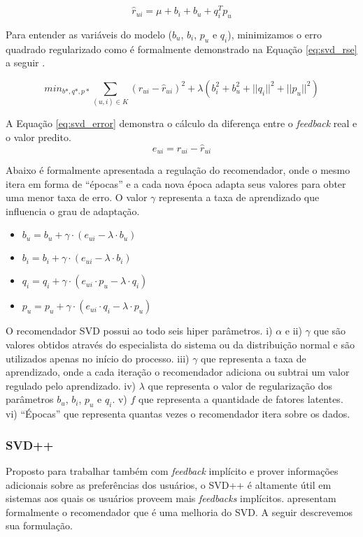 \begin{equation}
    \label{eq:svd_rating_bias}
    \hat{r}_{ui} = \mu + b_i + b_u + q_{i}^{T}p_u
\end{equation}

Para entender as variáveis do modelo ($b_u$, $b_i$, $p_u$ e $q_i$), minimizamos o erro quadrado regularizado como é formalmente demonstrado na Equação \ref{eq:svd_rse} a seguir \cite{Koren:2015}.

\begin{equation}
    \label{eq:svd_rse}
    min_{b*,q*,p*}\sum_{(u,i) \in K} (r_{ui} - \hat{r}_{ui})^2 + \lambda(b_i^2 + b_u^2 + ||q_i||^2 + ||p_u||^2)
\end{equation}

A Equação \ref{eq:svd_error} demonstra o cálculo da diferença entre o \textit{feedback} real e o valor predito.
\begin{equation}
    \label{eq:svd_error}
    e_{ui} = r_{ui} - \hat{r}_{ui}
\end{equation}

Abaixo é formalmente apresentada a regulação do recomendador, onde o mesmo itera em forma de ``épocas'' e a cada nova época adapta seus valores para obter uma menor taxa de erro. O valor $\gamma$ representa a taxa de aprendizado que influencia o grau de adaptação.
\begin{itemize}
    \item $b_u = b_u + \gamma \cdot (e_{ui} - \lambda \cdot b_u)$
    \item $b_i = b_i + \gamma \cdot (e_{ui} - \lambda \cdot b_i)$
    \item $q_i = q_i + \gamma \cdot (e_{ui} \cdot p_u - \lambda \cdot q_i)$
    \item $p_u = p_u + \gamma \cdot (e_{ui} \cdot q_i - \lambda \cdot p_u)$
\end{itemize}

O recomendador \ac{SVD} possui ao todo seis hiper parâmetros. i) $\alpha$ e ii) $\gamma$ que são valores obtidos através do especialista do sistema ou da distribuição normal e são utilizados apenas no início do processo. iii) $\gamma$ que representa a taxa de aprendizado, onde a cada iteração o recomendador adiciona ou subtrai um valor regulado pelo aprendizado. iv) $\lambda$ que representa o valor de regularização dos parâmetros $b_u$, $b_i$, $p_u$ e $q_i$. v) $f$ que representa a quantidade de fatores latentes. vi) ``Épocas'' que representa quantas vezes o recomendador itera sobre os dados.

\subsubsection{SVD++}
Proposto para trabalhar também com \textit{feedback} implícito e prover informações adicionais sobre as preferências dos usuários, o \ac{SVD++} é altamente útil em sistemas aos quais os usuários proveem mais \textit{feedbacks} implícitos.  apresentam formalmente o recomendador que é uma melhoria do \ac{SVD}. A seguir descrevemos sua formulação.

